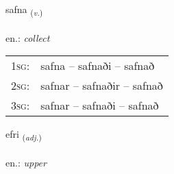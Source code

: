 \documentclass[frontgrid, backgrid]{flacards}\usepackage[]{graphicx}\usepackage[]{xcolor}
\begin{document}
\renewcommand{\flhead}{\vskip5pt \fboxsep=0pt {\small\bfseries\footnotesize Sagnorð | Verb}}
\renewcommand{\fcfoot}{\vskip5pt \fboxsep=0pt \hspace{2pt}{\small\bfseries\footnotesize 1K}}

\renewcommand{\blhead}{\vskip5pt {\small\bfseries\footnotesize Sagnorð | Verb }}
\renewcommand{\bcfoot}{\vskip5pt \hspace{2pt}{\small\bfseries\footnotesize 1K}}


{safna \small{\textsubscript{(\textit{v.})}} \\[1ex] %
\textphonetic{[sapna]} \\
en.: \emph{collect} \\  [2ex]
\renewcommand*{\arraystretch}{0.8}
\begin{tabular}{p{1cm}l}
\textsc{1sg}: & safna -- safnaði -- safnað \\ 
\textsc{2sg}: & safnar -- safnaðir -- safnað \\ 
\textsc{3sg}: & safnar -- safnaði -- safnað \\ 
\end{tabular}
}

\renewcommand{\flhead}{\vskip5pt \fboxsep=0pt {\small\bfseries\footnotesize Lýsingarorð | Adjective}}
\renewcommand{\fcfoot}{\vskip5pt \fboxsep=0pt \hspace{2pt}{\small\bfseries\footnotesize 1K}}

\renewcommand{\blhead}{\vskip5pt {\small\bfseries\footnotesize Lýsingarorð | Adjective }}
\renewcommand{\bcfoot}{\vskip5pt \hspace{2pt}{\small\bfseries\footnotesize 1K}}


{efri \small{\textsubscript{(\textit{adj.})}} \\[1ex] %
\textphonetic{[ɛvrɪ]} \\
en.: \emph{upper} \\  [2ex]
\renewcommand*{\arraystretch}{0.8}
}
\end{document}
